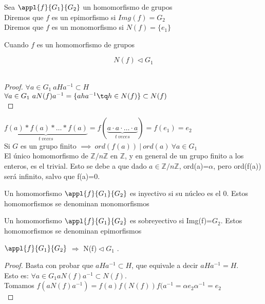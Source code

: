\documentclass[a4paper,10pt]{apuntes}
\begin{document}
\begin{defn}
Sea $\appl{f}{G_1}{G_2}$ un homomorfismo de grupos\\
Diremos que $f$ es un epimorfismo si $Img(f) = G_2$\\
Diremos que $f$ es un monomorfismo si $N(f) = \{ e_1\} $
\end{defn}

\begin{lemma} Cuando $f$ es un homomorfismo de grupos

$$N(f) \lhd G_1$$\\
\end{lemma}

\begin{proof}
$\forall a\in G_1\ aHa^{-1}\subset H$\\
$\forall a\in G_1\ aN(f)a^{-1} = \{aha^{-1} \tq h\in N(f) \}\subset N(f)$\\
\end{proof}


$\underbrace{f(a) \ast f(a) \ast \hdots \ast f(a)}_{t\ veces} = f(\underbrace{a \cdot a \cdot \hdots \cdot a}_{t\ veces}) = f(e_1) = e_2$\\ 
Si $G$ es un grupo finito $\implies\ ord(f(a))\ |\ ord(a)\ \forall a \in G_1$\\

El único homomorfismo de $\mathds{Z}/n\mathds{Z}$  en $\mathds{Z}$, y en general de un grupo finito a los enteros, es el trivial. Esto se debe
a que dado $a\in\mathds{Z}/n\mathds{Z}$, ord(a)=$\alpha$, pero ord(f(a)) será infinito, salvo que f(a)=0.

\begin{defn}
 Un homomorfismo $\appl{f}{G_1}{G_2}$  es inyectivo si su núcleo es el 0. Estos homomorfismos se denominan monomorfismos
\end{defn}
\begin{defn}
 Un homomorfismo $\appl{f}{G_1}{G_2}$  es sobreyectivo si Img(f)=$G_2$. Estos homomorfismos se denominan epimorfismos
\end{defn}
 
 \begin{lemma}
  $\appl{f}{G_1}{G_2}$  $\Rightarrow$  N(f)$\vartriangleleft G_1$ .
 \end{lemma}
  \begin{proof}
   Basta con probar que $aHa^{-1}\subset H$, que equivale a decir $aHa^{-1}=H$.\\
   Esto es: $\forall a \in G_{1} aN(f)a^{-1}\subset N(f)$.\\
   Tomamos $f(aN(f)a^{-1})=f(a)f(N(f))f(a^{-1}=\alpha e_{2} \alpha^{-1}=e_{2}$\\
  \end{proof}
  
\end{document}
